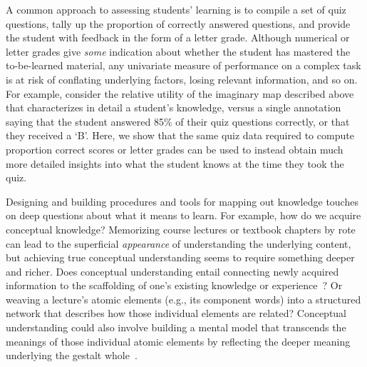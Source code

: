 \documentclass[10pt]{article}
\begin{document}
A common approach to assessing students' learning is to compile a set of quiz
questions, tally up the proportion of correctly answered questions, and provide
the student with feedback in the form of a letter grade. Although numerical or
letter grades give \textit{some} indication about whether the student has
mastered the to-be-learned material, any univariate measure of performance on a
complex task is at risk of conflating underlying factors, losing relevant
information, and so on. For example, consider the relative utility of the
imaginary map described above that characterizes in detail a student's
knowledge, versus a single annotation saying that the student answered 85\% of
their quiz questions correctly, or that they received a `B'. Here, we show that
the same quiz data required to compute proportion correct scores or letter
grades can be used to instead obtain much more detailed insights into what the
student knows at the time they took the quiz.

Designing and building procedures and tools for mapping out knowledge touches
on deep questions about what it means to learn. For example, how do we acquire
conceptual knowledge? Memorizing course lectures or textbook chapters by rote
can lead to the superficial \textit{appearance} of understanding the underlying
content, but achieving true conceptual understanding seems to require something
deeper and richer. Does conceptual understanding entail connecting newly
acquired information to the scaffolding of one's existing knowledge or
experience~\citep{BlayEtal06,CaraMaho03, ConsEtal16, DeacEtal04, SimoEtal04}?
Or weaving a lecture's atomic elements (e.g., its component words) into a
structured network that describes how those individual elements are related?
Conceptual understanding could also involve building a mental model that
transcends the meanings of those individual atomic elements by reflecting the
deeper meaning underlying the gestalt whole~\citep{Kint70, Macl05, ScotEtal07}.
\end{document}
